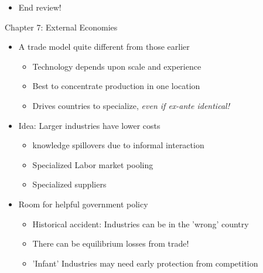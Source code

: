 \documentclass[ignorenonframetext,]{beamer}
\begin{document}

\begin{frame}
    \begin{itemize}
        \item End review!
    \end{itemize}
\end{frame}

\begin{frame}{Chapter 7: External Economies}

    \begin{itemize}
        \item A trade model quite different from those earlier 
            \begin{itemize}
            \item Technology depends upon scale and experience
            \item Best to concentrate production in one location
            \item Drives countries to specialize, \emph{even if ex-ante identical!}
        \end{itemize}
        \item Idea: Larger industries have lower costs
        \begin{itemize}
            \item knowledge spillovers due to informal interaction
            \item Specialized Labor market pooling
            \item Specialized suppliers
        \end{itemize}
        \item Room for helpful government policy 
        \begin{itemize}
            \item Historical accident: Industries can be in the 'wrong' country 
            \item There can be equilibrium losses from trade!
            \item 'Infant' Industries may need early protection from competition
        \end{itemize}
    \end{itemize}
            
\end{frame}
\end{document}
